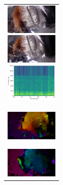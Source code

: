 \begin{figure}[htbp]
\begin{tabular}{l}
\begin{minipage}{0.165\hsize}
\begin{center}
        \end{center}
      \end{minipage}
      \begin{minipage}{0.165\hsize}
        \begin{center}
          \includegraphics[clip, width=2.5cm]{./Figures/still_sniffcling4.eps}
        \end{center}
      \end{minipage}
      \begin{minipage}{0.165\hsize}
        \begin{center}
          \includegraphics[clip, width=2.5cm]{./Figures/still_sniffcling5.eps}
        \end{center}
      \end{minipage}
      \begin{minipage}{0.165\hsize}
        \begin{center}
          \includegraphics[clip, width=2.5cm]{./Figures/sound_sniffcling.eps}
        \end{center}
      \end{minipage}
\\  %
      \begin{minipage}{0.165\hsize}
        \begin{center}
          \includegraphics[clip, width=2.5cm]{./Figures/optic_sniffcling1.eps}
          \hspace{0.3cm} { }
        \end{center}
      \end{minipage}
      \begin{minipage}{0.165\hsize}
        \begin{center}
          \includegraphics[clip, width=2.5cm]{./Figures/optic_sniffcling2.eps}

\end{center}
\end{minipage}
\end{tabular}
\end{figure}
